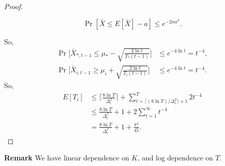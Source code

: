 \begin{proof}
\begin{framed}
\begin{fact}
\begin{equation}
                \Pr[\bar X\le E[\bar X] - a] \le e^{-2na^2}.
            \end{equation}
        \end{fact}
    \end{framed}
    So,
    \begin{align}
        \Pr\bigg[\bar X_{*,t-1} \le \mu_* - \sqrt{\frac{2\ln t}{T_{*}(t-1)}}\bigg]
            &\le e^{-4\ln t} = t^{-4}, \\
        \Pr\bigg[\bar X_{i,t-1} \ge \mu_i + \sqrt{\frac{2\ln t}{T_{i}(t-1)}}\bigg]
            &\le e^{-4\ln t} = t^{-4}.
    \end{align}
    So,
    \begin{align}
        E[T_i]
            &\le \bigg\lceil \frac{8\ln T}{\Delta_i^2}\bigg\rceil + \sum_{t=\lceil (8\ln T)/\Delta_i^2\rceil+1}^T 2t^{-4} \\
            &\le \frac{8\ln T}{\Delta_i^2} + 1 + 2\sum_{t=1}^\infty t^{-4} \\
            &= \frac{8\ln T}{\Delta_i^2} + 1 + \frac{\pi^4}{45}.
    \end{align}
\end{proof}

\textbf{Remark}
We have linear dependence on $K$,
and log dependence on $T$.
